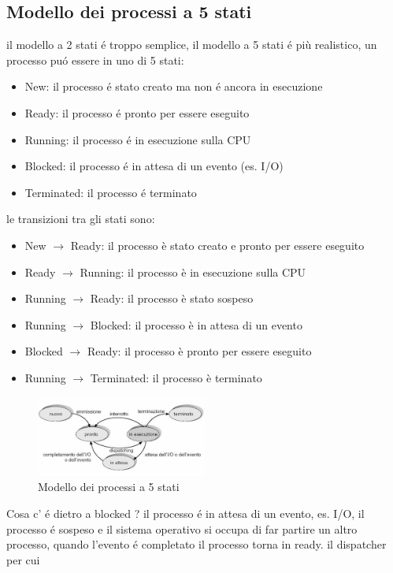 \subsection{Modello dei processi a 5 stati}
il modello a 2 stati é troppo semplice, il modello a 5 stati é più realistico, un processo puó essere in uno di 5 stati:
\begin{itemize}
    \item New: il processo é stato creato ma non é ancora in esecuzione
    \item Ready: il processo é pronto per essere eseguito
    \item Running: il processo é in esecuzione sulla CPU
    \item Blocked: il processo é in attesa di un evento (es. I/O)
    \item Terminated: il processo é terminato
    \end{itemize}
le transizioni tra gli stati sono:
\begin{itemize}
    \item New $\rightarrow$ Ready: il processo è stato creato e pronto per essere eseguito
    \item Ready $\rightarrow$ Running: il processo è in esecuzione sulla CPU
    \item Running $\rightarrow$ Ready: il processo è stato sospeso
    \item Running $\rightarrow$ Blocked: il processo è in attesa di un evento
    \item Blocked $\rightarrow$ Ready: il processo è pronto per essere eseguito
    \item Running $\rightarrow$ Terminated: il processo è terminato
\end{itemize}
\begin{figure}[h]
    \centering
    \includegraphics[width=0.5\textwidth]{immagini/processo a 5 stati}
    \caption{Modello dei processi a 5 stati}
\end{figure}
Cosa c' é dietro a blocked ? il processo é in attesa di un evento, es. I/O, il processo é sospeso e il sistema operativo
si occupa di far partire un altro processo, quando l'evento é completato il processo torna in ready. il dispatcher per cui
